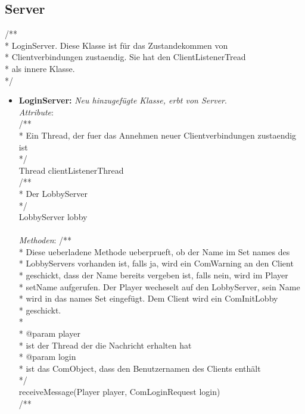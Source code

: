 \documentclass{article}
\begin{document}
\subsection{Server}
/**\\
 * LoginServer. Diese Klasse ist für das Zustandekommen von \\
 * Clientverbindungen zustaendig. Sie hat den ClientListenerTread\\
 * als innere Klasse.\\
 */\\
\begin{itemize}
\item  \textbf{LoginServer:}  \textit{Neu hinzugefügte Klasse, erbt von Server}.\\
\textit{Attribute}:  \\
/**\\
 * Ein Thread, der fuer das Annehmen neuer Clientverbindungen zustaendig ist\\
 */\\
Thread clientListenerThread\\
/**\\
 * Der LobbyServer\\
 */\\
LobbyServer lobby \\
\\
\textit{Methoden}: 
/**\\
 * Diese ueberladene Methode ueberprueft, ob der Name im Set names des\\
 * LobbyServers vorhanden ist, falls ja, wird ein ComWarning an den Client\\
 * geschickt, dass der Name bereits vergeben ist, falls nein, wird im Player\\
 * setName aufgerufen. Der Player wecheselt auf den LobbyServer, sein Name\\
 * wird in das names Set eingefügt. Dem Client wird ein ComInitLobby\\
 * geschickt.\\
 *\\
 * @param player\\
 *            ist der Thread der die Nachricht erhalten hat\\
 * @param login\\
 *            ist das ComObject, dass den Benutzernamen des Clients enthält\\
 */\\
receiveMessage(Player player, ComLoginRequest login) \\
/**\\

\end{itemize}
\end{document}
